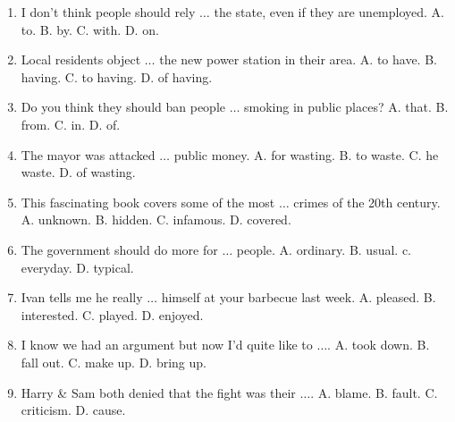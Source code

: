 \documentclass{article}
\numberwithin{equation}{section}
\begin{document}
\begin{enumerate}[leftmargin=8mm]
	\item I don't think people should rely $\ldots$ the state, even if they are unemployed. {\sf A.} to. {\sf B.} by. {\sf C.} with. {\sf D.} on.
	\item Local residents object $\ldots$ the new power station in their area. {\sf A.} to have. {\sf B.} having. {\sf C.} to having. {\sf D.} of having.
	\item Do you think they should ban people $\ldots$ smoking in public places? {\sf A.} that. {\sf B.} from. {\sf C.} in. {\sf D.} of.
	\item The mayor was attacked $\ldots$ public money. {\sf A.} for wasting. {\sf B.} to waste. {\sf C.} he waste. {\sf D.} of wasting.
	\item This fascinating book covers some of the most $\ldots$ crimes of the 20th century. {\sf A.} unknown. {\sf B.} hidden. {\sf C.} infamous. {\sf D.} covered.
	\item The government should do more for $\ldots$ people. {\sf A.} ordinary. {\sf B.} usual. c. everyday. {\sf D.} typical.
	\item Ivan tells me he really $\ldots$ himself at your barbecue last week. {\sf A.} pleased. {\sf B.} interested. {\sf C.} played. {\sf D.} enjoyed.
	\item I know we had an argument but now I'd quite like to $\ldots$. {\sf A.} took down. {\sf B.} fall out. {\sf C.} make up. {\sf D.} bring up.
	\item Harry \& Sam both denied that the fight was their $\ldots$. {\sf A.} blame. {\sf B.} fault. {\sf C.} criticism. {\sf D.} cause.
\end{enumerate}


\printbibliography[heading=bibintoc]
	
\end{document}
